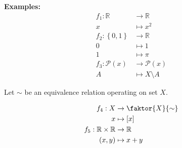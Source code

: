 \documentclass[a4paper,landscape,twocolumn]{article}
\newcommand\set[1]{\left\{#1\right\}}
\begin{document}
\textbf{Examples:}
\begin{align*}
  f_1: \mathbb{R} &\rightarrow \mathbb{R} \\
                x &\mapsto x^2 \\
  f_2: \set{0,1}  &\rightarrow \mathbb{R} \\
                0 &\mapsto 1 \\
                1 &\mapsto \pi \\
  f_3: \mathcal{P}(x) &\rightarrow \mathcal{P}(x) \\
                A &\mapsto X \setminus A
\end{align*}

Let $\sim$ be an equivalence relation operating on set $X$.

\begin{align*}
  f_4: X &\rightarrow \faktor{X}{\sim} \\
       x &\mapsto [x] \\
  f_5: \mathbb{R} \times \mathbb{R} &\rightarrow \mathbb{R} \\
       (x,y) &\mapsto x+y
\end{align*}
\end{document}
